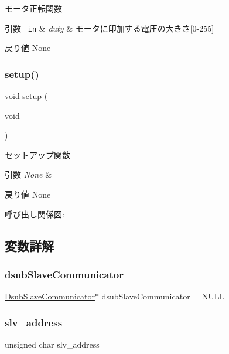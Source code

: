 モータ正転関数 


\begin{DoxyParams}[1]{引数}
\mbox{\texttt{ in}}  & {\em duty} & モータに印加する電圧の大きさ\mbox{[}0-\/255\mbox{]} \\
\hline
\end{DoxyParams}
\begin{DoxyReturn}{戻り値}
None 
\end{DoxyReturn}
\mbox{\label{iraira__bo__up__down_8ino_a7dfd9b79bc5a37d7df40207afbc5431f}} 
\subsubsection{\texorpdfstring{setup()}{setup()}}
{\footnotesize\ttfamily void setup (\begin{DoxyParamCaption}\item[{void}]{ }\end{DoxyParamCaption})}



セットアップ関数 


\begin{DoxyParams}{引数}
{\em None} & \\
\hline
\end{DoxyParams}
\begin{DoxyReturn}{戻り値}
None 
\end{DoxyReturn}
呼び出し関係図\+:


\subsection{変数詳解}
\mbox{\label{iraira__bo__up__down_8ino_adb2253a9db904473e0b317580548c627}} 
\subsubsection{\texorpdfstring{dsubSlaveCommunicator}{dsubSlaveCommunicator}}
{\footnotesize\ttfamily \mbox{\hyperlink{class_dsub_slave_communicator}{Dsub\+Slave\+Communicator}}$\ast$ dsub\+Slave\+Communicator = N\+U\+LL}

\mbox{\label{iraira__bo__up__down_8ino_aeba7e981bd419ac0d5ca8e5e4198bf06}} 
\subsubsection{\texorpdfstring{slv\_address}{slv\_address}}
{\footnotesize\ttfamily unsigned char slv\+\_\+address}


